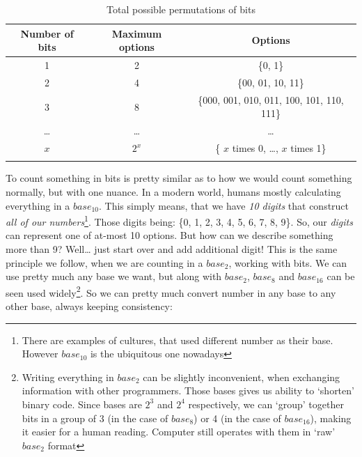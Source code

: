 \documentclass{report}
\begin{document}
            \begin{table}[h]
                \centering
                \begin{longtable}{|c|c|c|}
                    \hline
                    Number of bits & Maximum options & Options \\\hline
                    1 & 2 & \{0, 1\} \\\hline
                    2 & 4 & \{00, 01, 10, 11\} \\\hline
                    3 & 8 & \{000, 001, 010, 011, 100, 101, 110, 111\} \\\hline
                    \ldots & \ldots & \ldots \\\hline
                    $x$ & $2^x$ & \{ $x$ times 0, \ldots, $x$ times 1\} \\\hline
                    \caption{Total possible permutations of bits}

                \end{longtable}
            \end{table}

            To count something in bits is pretty similar as to how we would count something normally, but with one nuance. In a modern world, humans mostly calculating 
            everything in a $base_{10}$. This simply means, that we have \emph{10 digits} that construct \emph{all of our numbers}\footnote{There are examples of cultures, that used different number as their base. However $base_{10}$ is the ubiquitous one nowadays}. 
            Those digits being: \{0, 1, 2, 3, 4, 5, 6, 7, 8, 9\}. So, our \emph{digits} can represent one of at-most 10 options. But how can we describe something more
            than 9? Well\ldots{} just start over and add additional digit! This is the same principle we follow, when we are counting in a $base_2$, working with bits.
            We can use pretty much any base we want, but along with $base_2$, $base_8$ and $base_{16}$ can be seen used widely\footnote{Writing everything in $base_2$
            can be slightly inconvenient, when exchanging information with other programmers. Those bases gives us ability to `shorten' binary code. Since bases
            are $2^3$ and $2^4$ respectively, we can `group' together bits in a group of 3 (in the case of $base_8$) or 4 (in the case of $base_{16}$), making it 
            easier for a human reading. Computer still operates with them in `raw' $base_2$ format}. So we can pretty much convert number in any base to any other 
            base, always keeping consistency:
\end{document}
